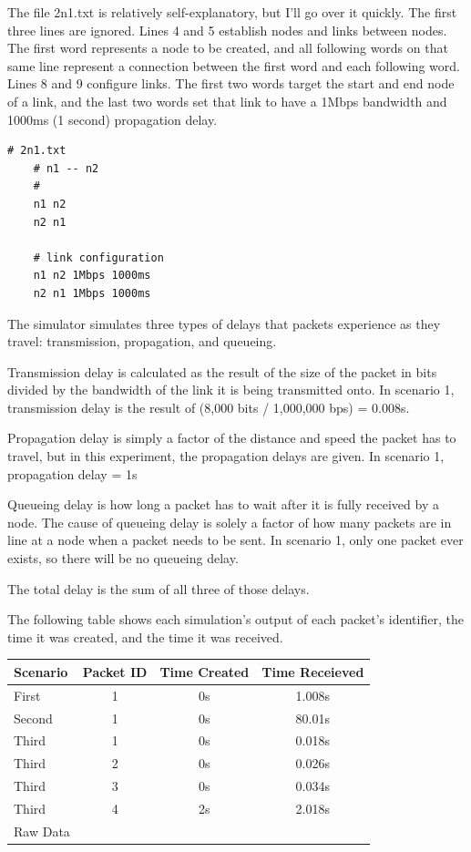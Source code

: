\documentclass[11pt]{article}
\begin{document}
The file 2n1.txt is relatively self-explanatory, but I'll go over it quickly. The first three lines are ignored. Lines 4 and 5 establish nodes and links between nodes. The first word represents a node to be created, and all following words on that same line represent a connection between the first word and each following word. Lines 8 and 9 configure links. The first two words target the start and end node of a link, and the last two words set that link to have a 1Mbps bandwidth and 1000ms (1 second) propagation delay.

\vspace{5mm}
\begin{absolutelynopagebreak}
\begin{lstlisting}
# 2n1.txt
    # n1 -- n2
    #
    n1 n2
    n2 n1

    # link configuration
    n1 n2 1Mbps 1000ms
    n2 n1 1Mbps 1000ms
\end{lstlisting}
\end{absolutelynopagebreak}
\vspace{5mm}

The simulator simulates three types of delays that packets experience as they travel: transmission, propagation, and queueing. 

Transmission delay is calculated as the result of the size of the packet in bits divided by the bandwidth of the link it is being transmitted onto. In scenario 1, transmission delay is the result of (8,000 bits / 1,000,000 bps) = 0.008s.

Propagation delay is simply a factor of the distance and speed the packet has to travel, but in this experiment, the propagation delays are given. In scenario 1, propagation delay = 1s

Queueing delay is how long a packet has to wait after it is fully received by a node. The cause of queueing delay is solely a factor of how many packets are in line at a node when a packet needs to be sent. In scenario 1, only one packet ever exists, so there will be no queueing delay.

The total delay is the sum of all three of those delays.

The following table shows each simulation's output of each packet's identifier, the time it was created, and the time it was received.

\vspace{0.5cm}
\begin{absolutelynopagebreak}
\begin{tabular}{lccc}
  \toprule
  Scenario & Packet ID & Time Created & Time Receieved\\
  \midrule
  First & 1 & 0s & 1.008s \\
  Second & 1 & 0s & 80.01s \\
  Third & 1 & 0s & 0.018s \\
  Third & 2 & 0s & 0.026s \\
  Third & 3 & 0s & 0.034s \\
  Third & 4 & 2s & 2.018s \\
  \bottomrule
  Raw Data
\end{tabular}
\end{absolutelynopagebreak}
\vspace{0.5cm}
\end{document}
